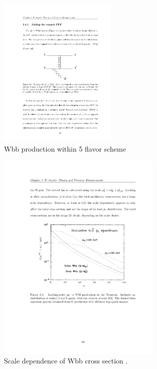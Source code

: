 \begin{figure}[htbp]
	\centering
		\includegraphics[width=0.5\textwidth]{Figures/5FS_diag.pdf}
	\caption[Wbb production within 5 flavor scheme]{Wbb production within 5 flavor scheme}
	\label{fig:5FS_diag}
\end{figure}
\begin{figure}[htbp]
	\centering
		\includegraphics[width=0.7\textwidth]{Figures/scale_dep.pdf}
	\caption[Scale dependence of Wbb cross section]{Scale dependence of Wbb cross section \cite{Mangano:1992kp}.}
	\label{fig:scale_dep}
\end{figure}
